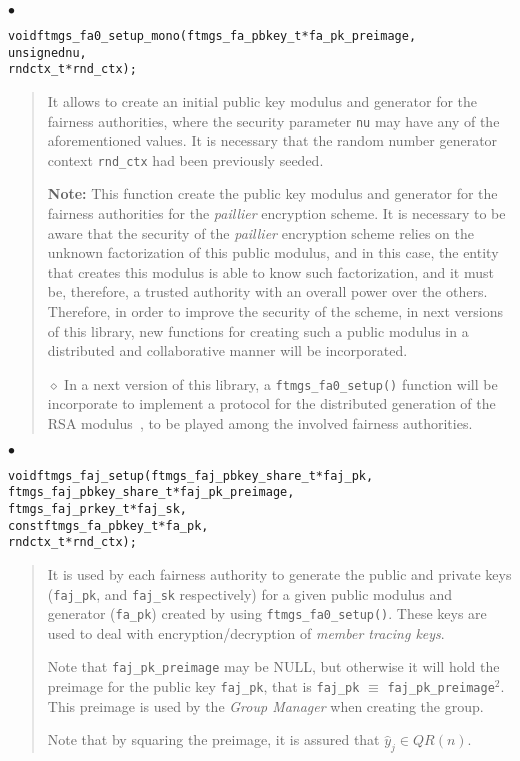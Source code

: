 \documentclass[a4paper]{article}
\newenvironment{api}%
{\noindent$\bullet$\hfill\begin{minipage}[t]{0.97\linewidth}\footnotesize\begin{alltt}}%
{\end{alltt}\end{minipage}}%
\begin{document}
\begin{api}
void ftmgs_fa0_setup_mono(ftmgs_fa_pbkey_t* fa_pk_preimage,
                          unsigned nu,
                          rndctx_t* rnd_ctx);
\end{api}
\begin{quote}\footnotesize
It allows to create an initial public key modulus and generator for
the fairness authorities, where the security parameter \verb|nu| may
have any of the aforementioned values. It is necessary that the random
number generator context \verb|rnd_ctx| had been previously seeded.

\textbf{Note:} This function create the public key modulus and
generator for the fairness authorities for the \emph{paillier}
encryption scheme. It is necessary to be aware that the security of
the \emph{paillier} encryption scheme relies on the unknown
factorization of this public modulus, and in this case, the entity
that creates this modulus is able to know such factorization, and it
must be, therefore, a trusted authority with an overall power over the
others. Therefore, in order to improve the security of the scheme, in
next versions of this library, new functions for creating such a
public modulus in a distributed and collaborative manner will be
incorporated.

$\diamond$ In a next version of this library, a \verb|ftmgs_fa0_setup()|
function will be incorporate to implement a protocol for the
distributed generation of the RSA modulus~\cite{FS01}, to be played
among the involved fairness authorities.
\end{quote}
\begin{api}
void ftmgs_faj_setup(ftmgs_faj_pbkey_share_t* faj_pk,
                     ftmgs_faj_pbkey_share_t* faj_pk_preimage,
                     ftmgs_faj_prkey_t* faj_sk,
                     const ftmgs_fa_pbkey_t* fa_pk,
                     rndctx_t* rnd_ctx);
\end{api}
\begin{quote}\footnotesize
It is used by each fairness authority to generate the public and
private keys (\verb|faj_pk|, and \verb|faj_sk| respectively) for a
given public modulus and generator (\verb|fa_pk|) created by using
\verb|ftmgs_fa0_setup()|. These keys are used to deal with
encryption/decryption of \emph{member tracing keys}.

Note that \verb|faj_pk_preimage| may be NULL, but otherwise it will
hold the preimage for the public key \verb|faj_pk|, that is 
\verb|faj_pk| $\equiv$ \verb|faj_pk_preimage|$^2$. This preimage is
used by the \emph{Group Manager} when creating the group.

Note that by squaring the preimage, it is assured that
$\hat{y}_j\in\mathit{QR}(n)$.
\end{quote}
\end{document}
